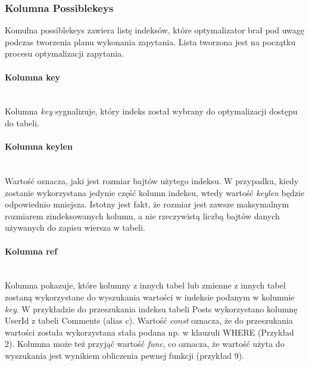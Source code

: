\subsubsection{Kolumna Possible\textunderscore keys}
Komulna possible\textunderscore keys zawiera listę indeksów, które optymalizator brał pod uwagę podczas tworzenia planu wykonania zapytania. Lista tworzona jest na początku procesu optymalizacji zapytania.

\paragraph{Kolumna key}\leavevmode\\
Kolumna \textit{key} sygnalizuje, który indeks został wybrany do optymalizacji dostępu do tabeli.

\paragraph{Kolumna key\textunderscore len}\leavevmode\\
Wartość oznacza, jaki jest rozmiar bajtów użytego indeksu. W przypadku, kiedy zostanie wykorzystana jedynie część kolumn indeksu, wtedy wartość \textit{key\textunderscore len} będzie odpowiednio mniejsza. Istotny jest fakt, że rozmiar jest zawsze maksymalnym rozmiarem zindeksowanych kolumn, a nie rzeczywistą liczbą bajtów danych używanych do zapisu wiersza w tabeli.

\paragraph{Kolumna ref}\leavevmode\\
Kolumna pokazuje, które kolumny z innych tabel lub zmienne z innych tabel zostaną wykorzystane do wyszukania wartości w indeksie podanym w kolumnie \textit{key}. W przykładzie do przeszukania indeksu tabeli Posts wykorzystano kolumnę UserId z tabeli Comments (alias c). Wartość \textit{const} oznacza, że do przeszukania wartości została wykorzystana stała podana np. w klauzuli WHERE (Przykład 2). Kolumna może też przyjąć wartość \textit{func}, co oznacza, że wartość użyta do wyszukania jest wynikiem obliczenia pewnej funkcji (przykład 9).

